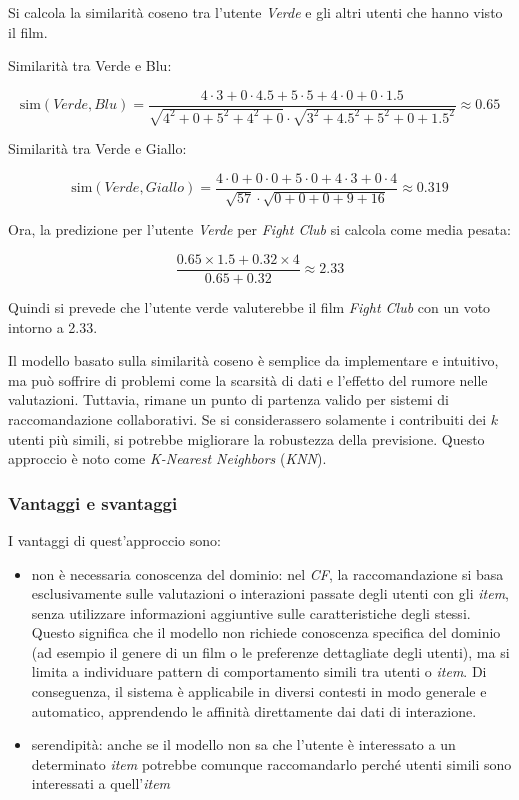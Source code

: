 Si calcola la similarità coseno tra l'utente \textit{Verde} e gli altri utenti che hanno visto il film. 

Similarità tra Verde e Blu:

\[
\text{sim}(Verde, Blu) = \frac{4 \cdot 3 + 0 \cdot 4.5 + 5 \cdot 5 + 4 \cdot 0 + 0 \cdot 1.5}{\sqrt{4^2 + 0 + 5^2 + 4^2 + 0} \cdot \sqrt{3^2 + 4.5^2 + 5^2 + 0 + 1.5^2}} \approx 0.65
\]

Similarità tra Verde e Giallo:

\[
\text{sim}(Verde, Giallo) = \frac{4 \cdot 0 + 0 \cdot 0 + 5 \cdot 0 + 4 \cdot 3 + 0 \cdot 4}{\sqrt{57} \cdot \sqrt{0 + 0 + 0 + 9 + 16}} \approx 0.319
\]

Ora, la predizione per l'utente \textit{Verde} per \textit{Fight Club} si calcola come media pesata:

\[
\frac{0.65 \times 1.5 + 0.32 \times 4}{0.65 + 0.32} \approx 2.33
\]

Quindi si prevede che l'utente verde valuterebbe il film \textit{Fight Club} con un voto intorno a 2.33.

Il modello basato sulla similarità coseno è semplice da implementare e intuitivo, ma può soffrire di problemi come la scarsità di dati e l'effetto del rumore nelle valutazioni. Tuttavia, rimane un punto di partenza valido per sistemi di raccomandazione collaborativi. Se si considerassero solamente i contribuiti dei $k$ utenti più simili, si potrebbe migliorare la robustezza della previsione. Questo approccio è noto come \textit{K-Nearest Neighbors} (\textit{KNN}).

\subsubsection{Vantaggi e svantaggi}

I vantaggi di quest'approccio sono:

\begin{itemize}
  \item non è necessaria conoscenza del dominio: nel \textit{CF}, la raccomandazione si basa esclusivamente sulle valutazioni o interazioni passate degli utenti con gli \textit{item}, senza utilizzare informazioni aggiuntive sulle caratteristiche degli stessi. Questo significa che il modello non richiede conoscenza specifica del dominio (ad esempio il genere di un film o le preferenze dettagliate degli utenti), ma si limita a individuare pattern di comportamento simili tra utenti o \textit{item}. Di conseguenza, il sistema è applicabile in diversi contesti in modo generale e automatico, apprendendo le affinità direttamente dai dati di interazione.
  \item serendipità: anche se il modello non sa che l'utente è interessato a un determinato \textit{item} potrebbe comunque raccomandarlo perché utenti simili sono interessati a quell'\textit{item}

\end{itemize}

